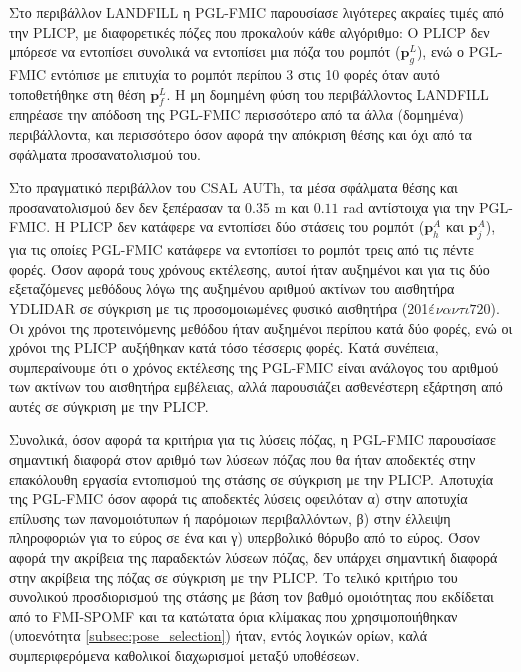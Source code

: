 Στο περιβάλλον LANDFILL η PGL-FMIC παρουσίασε λιγότερες ακραίες τιμές από την PLICP, με
διαφορετικές πόζες που προκαλούν κάθε αλγόριθμο: Ο PLICP δεν μπόρεσε να εντοπίσει συνολικά
να εντοπίσει μια πόζα του ρομπότ ($\bm{p}_g^L$), ενώ ο PGL-FMIC εντόπισε με επιτυχία
το ρομπότ περίπου 3 στις 10 φορές όταν αυτό τοποθετήθηκε στη θέση $\bm{p}_f^L$.
Η μη δομημένη φύση του περιβάλλοντος LANDFILL επηρέασε την απόδοση της PGL-FMIC
περισσότερο από τα άλλα (δομημένα) περιβάλλοντα, και περισσότερο όσον αφορά την
απόκριση θέσης και όχι από τα σφάλματα προσανατολισμού του.

Στο πραγματικό περιβάλλον του CSAL AUTh, τα μέσα σφάλματα θέσης και προσανατολισμού δεν
δεν ξεπέρασαν τα $0.35$ m και $0.11$ rad αντίστοιχα για την PGL-FMIC. Η PLICP δεν
κατάφερε να εντοπίσει δύο στάσεις του ρομπότ ($\bm{p}_h^A$ και $\bm{p}_j^A$), για τις οποίες
PGL-FMIC κατάφερε να εντοπίσει το ρομπότ τρεις από τις πέντε φορές. Όσον αφορά
τους χρόνους εκτέλεσης, αυτοί ήταν αυξημένοι και για τις δύο εξεταζόμενες μεθόδους λόγω της
αυξημένου αριθμού ακτίνων του αισθητήρα YDLIDAR σε σύγκριση με τις προσομοιωμένες
φυσικό αισθητήρα (201$ έναντι 720$). Οι χρόνοι της προτεινόμενης μεθόδου ήταν αυξημένοι
περίπου κατά δύο φορές, ενώ οι χρόνοι της PLICP αυξήθηκαν κατά τόσο
τέσσερις φορές. Κατά συνέπεια, συμπεραίνουμε ότι ο χρόνος εκτέλεσης της PGL-FMIC
είναι ανάλογος του αριθμού των ακτίνων του αισθητήρα εμβέλειας, αλλά παρουσιάζει ασθενέστερη
εξάρτηση από αυτές σε σύγκριση με την PLICP.

Συνολικά, όσον αφορά τα κριτήρια για τις λύσεις πόζας, η PGL-FMIC παρουσίασε
σημαντική διαφορά στον αριθμό των λύσεων πόζας που θα ήταν αποδεκτές
στην επακόλουθη εργασία εντοπισμού της στάσης σε σύγκριση με την PLICP. Αποτυχία της PGL-FMIC
όσον αφορά τις αποδεκτές λύσεις οφειλόταν α) στην αποτυχία επίλυσης των
πανομοιότυπων ή παρόμοιων περιβαλλόντων, β) στην έλλειψη πληροφοριών για το εύρος σε ένα
και γ) υπερβολικό θόρυβο από το εύρος. Όσον αφορά την ακρίβεια της
παραδεκτών λύσεων πόζας, δεν υπάρχει σημαντική διαφορά στην ακρίβεια της πόζας
σε σύγκριση με την PLICP. Το τελικό κριτήριο του συνολικού προσδιορισμού της στάσης
με βάση τον βαθμό ομοιότητας που εκδίδεται από το FMI-SPOMF και τα κατώτατα όρια κλίμακας
που χρησιμοποιήθηκαν (υποενότητα \ref{subsec:pose_selection}) ήταν, εντός λογικών ορίων, καλά συμπεριφερόμενα
καθολικοί διαχωρισμοί μεταξύ υποθέσεων.
